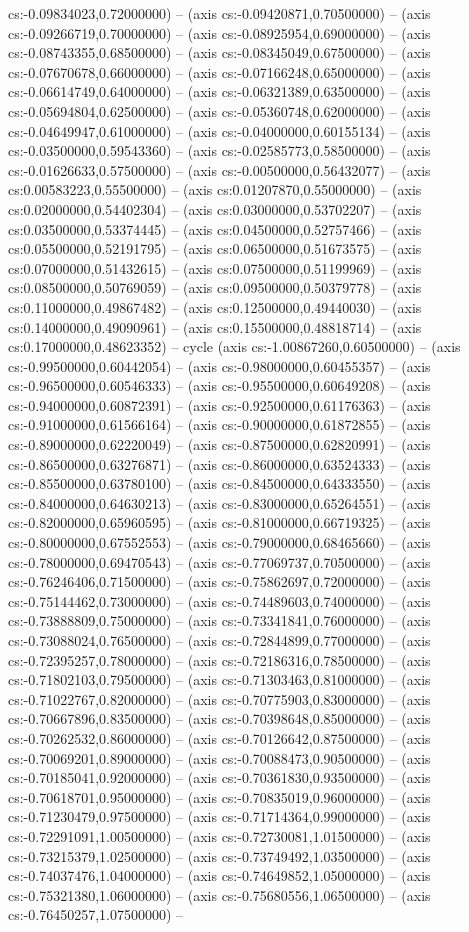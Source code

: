 cs:-0.09834023,0.72000000) -- (axis cs:-0.09420871,0.70500000) -- (axis cs:-0.09266719,0.70000000) -- (axis cs:-0.08925954,0.69000000) -- (axis cs:-0.08743355,0.68500000) -- (axis cs:-0.08345049,0.67500000) -- (axis cs:-0.07670678,0.66000000) -- (axis cs:-0.07166248,0.65000000) -- (axis cs:-0.06614749,0.64000000) -- (axis cs:-0.06321389,0.63500000) -- (axis cs:-0.05694804,0.62500000) -- (axis cs:-0.05360748,0.62000000) -- (axis cs:-0.04649947,0.61000000) -- (axis cs:-0.04000000,0.60155134) -- (axis cs:-0.03500000,0.59543360) -- (axis cs:-0.02585773,0.58500000) -- (axis cs:-0.01626633,0.57500000) -- (axis cs:-0.00500000,0.56432077) -- (axis cs:0.00583223,0.55500000) -- (axis cs:0.01207870,0.55000000) -- (axis cs:0.02000000,0.54402304) -- (axis cs:0.03000000,0.53702207) -- (axis cs:0.03500000,0.53374445) -- (axis cs:0.04500000,0.52757466) -- (axis cs:0.05500000,0.52191795) -- (axis cs:0.06500000,0.51673575) -- (axis cs:0.07000000,0.51432615) -- (axis cs:0.07500000,0.51199969) -- (axis cs:0.08500000,0.50769059) -- (axis cs:0.09500000,0.50379778) -- (axis cs:0.11000000,0.49867482) -- (axis cs:0.12500000,0.49440030) -- (axis cs:0.14000000,0.49090961) -- (axis cs:0.15500000,0.48818714) -- (axis cs:0.17000000,0.48623352) -- cycle (axis cs:-1.00867260,0.60500000) -- (axis cs:-0.99500000,0.60442054) -- (axis cs:-0.98000000,0.60455357) -- (axis cs:-0.96500000,0.60546333) -- (axis cs:-0.95500000,0.60649208) -- (axis cs:-0.94000000,0.60872391) -- (axis cs:-0.92500000,0.61176363) -- (axis cs:-0.91000000,0.61566164) -- (axis cs:-0.90000000,0.61872855) -- (axis cs:-0.89000000,0.62220049) -- (axis cs:-0.87500000,0.62820991) -- (axis cs:-0.86500000,0.63276871) -- (axis cs:-0.86000000,0.63524333) -- (axis cs:-0.85500000,0.63780100) -- (axis cs:-0.84500000,0.64333550) -- (axis cs:-0.84000000,0.64630213) -- (axis cs:-0.83000000,0.65264551) -- (axis cs:-0.82000000,0.65960595) -- (axis cs:-0.81000000,0.66719325) -- (axis cs:-0.80000000,0.67552553) -- (axis cs:-0.79000000,0.68465660) -- (axis cs:-0.78000000,0.69470543) -- (axis cs:-0.77069737,0.70500000) -- (axis cs:-0.76246406,0.71500000) -- (axis cs:-0.75862697,0.72000000) -- (axis cs:-0.75144462,0.73000000) -- (axis cs:-0.74489603,0.74000000) -- (axis cs:-0.73888809,0.75000000) -- (axis cs:-0.73341841,0.76000000) -- (axis cs:-0.73088024,0.76500000) -- (axis cs:-0.72844899,0.77000000) -- (axis cs:-0.72395257,0.78000000) -- (axis cs:-0.72186316,0.78500000) -- (axis cs:-0.71802103,0.79500000) -- (axis cs:-0.71303463,0.81000000) -- (axis cs:-0.71022767,0.82000000) -- (axis cs:-0.70775903,0.83000000) -- (axis cs:-0.70667896,0.83500000) -- (axis cs:-0.70398648,0.85000000) -- (axis cs:-0.70262532,0.86000000) -- (axis cs:-0.70126642,0.87500000) -- (axis cs:-0.70069201,0.89000000) -- (axis cs:-0.70088473,0.90500000) -- (axis cs:-0.70185041,0.92000000) -- (axis cs:-0.70361830,0.93500000) -- (axis cs:-0.70618701,0.95000000) -- (axis cs:-0.70835019,0.96000000) -- (axis cs:-0.71230479,0.97500000) -- (axis cs:-0.71714364,0.99000000) -- (axis cs:-0.72291091,1.00500000) -- (axis cs:-0.72730081,1.01500000) -- (axis cs:-0.73215379,1.02500000) -- (axis cs:-0.73749492,1.03500000) -- (axis cs:-0.74037476,1.04000000) -- (axis cs:-0.74649852,1.05000000) -- (axis cs:-0.75321380,1.06000000) -- (axis cs:-0.75680556,1.06500000) -- (axis cs:-0.76450257,1.07500000) -- 